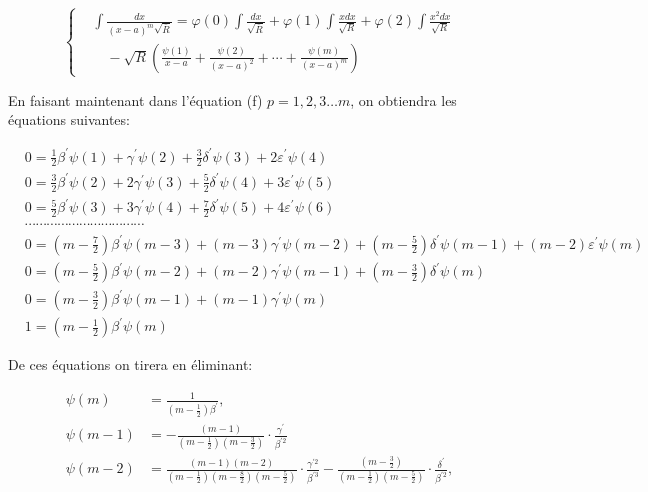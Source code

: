 \documentclass{article}
\begin{document}
\[
\left\{\begin{aligned}
& \int \frac{d x}{(x-a)^{m} \sqrt{\bar{R}}}=\varphi(0) \int \frac{d x}{\sqrt{\bar{R}}}+\varphi(1) \int \frac{x d x}{\sqrt{R}}+\varphi(2) \int \frac{x^{2} d x}{\sqrt{R}} \\
& \quad-\sqrt{R}\left(\frac{\psi(1)}{x-a}+\frac{\psi(2)}{(x-a)^{2}}+\cdots+\frac{\psi(m)}{(x-a)^{m}}\right)
\end{aligned}\right.
\]

En faisant maintenant dans l'équation (f) \(p=1,2,3 \ldots m\), on obtiendra les équations suivantes:

\[
\begin{aligned}
& 0=\frac{1}{2} \beta^{\prime} \psi(1)+\gamma^{\prime} \psi(2)+\frac{3}{2} \delta^{\prime} \psi(3)+2 \varepsilon^{\prime} \psi(4) \\
& 0=\frac{3}{2} \beta^{\prime} \psi(2)+2 \gamma^{\prime} \psi(3)+\frac{5}{2} \delta^{\prime} \psi(4)+3 \varepsilon^{\prime} \psi(5) \\
& 0=\frac{5}{2} \beta^{\prime} \psi(3)+3 \gamma^{\prime} \psi(4)+\frac{7}{2} \delta^{\prime} \psi(5)+4 \varepsilon^{\prime} \psi(6) \\
& \cdots \cdots \cdots \cdots \cdots \cdots \cdots \cdots \cdots \cdots \cdots \\
& 0=\left(m-\frac{7}{2}\right) \beta^{\prime} \psi(m-3)+(m-3) \gamma^{\prime} \psi(m-2)+\left(m-\frac{5}{2}\right) \delta^{\prime} \psi(m-1)+(m-2) \varepsilon^{\prime} \psi(m) \\
& 0=\left(m-\frac{5}{2}\right) \beta^{\prime} \psi(m-2)+(m-2) \gamma^{\prime} \psi(m-1)+\left(m-\frac{3}{2}\right) \delta^{\prime} \psi(m) \\
& 0=\left(m-\frac{3}{2}\right) \beta^{\prime} \psi(m-1)+(m-1) \gamma^{\prime} \psi(m) \\
& 1=\left(m-\frac{1}{2}\right) \beta^{\prime} \psi(m)
\end{aligned}
\]

De ces équations on tirera en éliminant:

\[
\begin{aligned}
\psi(m) & =\frac{1}{\left(m-\frac{1}{2}\right) \beta^{\prime}}, \\
\psi(m-1) & =-\frac{(m-1)}{\left(m-\frac{1}{2}\right)\left(m-\frac{3}{2}\right)} \cdot \frac{\gamma^{\prime}}{\beta^{\prime 2}} \\
\psi(m-2) & =\frac{(m-1)(m-2)}{\left(m-\frac{1}{2}\right)\left(m-\frac{8}{2}\right)\left(m-\frac{5}{2}\right)} \cdot \frac{\gamma^{\prime 2}}{\beta^{\prime 3}}-\frac{\left(m-\frac{3}{2}\right)}{\left(m-\frac{1}{2}\right)\left(m-\frac{5}{2}\right)} \cdot \frac{\delta^{\prime}}{\beta^{\prime 2}},
\end{aligned}
\]
\end{document}
